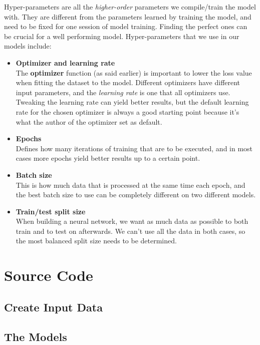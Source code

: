 Hyper-parameters are all the \textit{higher-order} parameters we compile/train the model with. They are different from the parameters learned by
training the model, and need to be fixed for one session of model training. Finding the perfect ones can be crucial for a well performing model. 
Hyper-parameters that we use in our models include:

\begin{itemize}
    \item \textbf{Optimizer and learning rate}\\
        The \textbf{optimizer} function (as said earlier) is important to lower the loss value when fitting the dataset to the model. 
        Different optimizers have different input parameters, and the \textit{learning rate} is one that all optimizers use. 
        Tweaking the learning rate can yield better results, but the default learning rate for the chosen optimizer is always a good starting point because
        it's what the author of the optimizer set as default.
    \item \textbf{Epochs}\\
        Defines how many iterations of training that are to be executed, and in most cases more epochs yield better results up to a certain point.
    \item \textbf{Batch size}\\
        This is how much data that is processed at the same time each epoch, and the best batch size to use can be completely different on 
        two different models. 
    \item \textbf{Train/test split size}\\
        When building a neural network, we want as much data as possible to both train and to test on afterwards. We can't use all the data 
        in both cases, so the most balanced split size needs to be determined.
\end{itemize}

\newpage

\section{Source Code}
\subsection{Create Input Data}


\newpage
\subsection{The Models}
